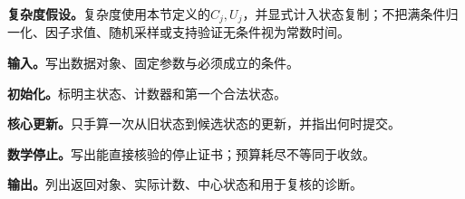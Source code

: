 \textbf{复杂度假设。}复杂度使用本节定义的$C_j,U_j$，并显式计入状态复制；不把满条件归一化、因子求值、随机采样或支持验证无条件视为常数时间。

\begingroup
{}

\begin{keypointbox}[title={带部分扫描诊断的系统Gibbs抽样：五步阅读}]
\textbf{输入。}写出数据对象、固定参数与必须成立的条件。\par
\textbf{初始化。}标明主状态、计数器和第一个合法状态。\par
\textbf{核心更新。}只手算一次从旧状态到候选状态的更新，并指出何时提交。\par
\textbf{数学停止。}写出能直接核验的停止证书；预算耗尽不等同于收敛。\par
\textbf{输出。}列出返回对象、实际计数、中心状态和用于复核的诊断。
\end{keypointbox}

